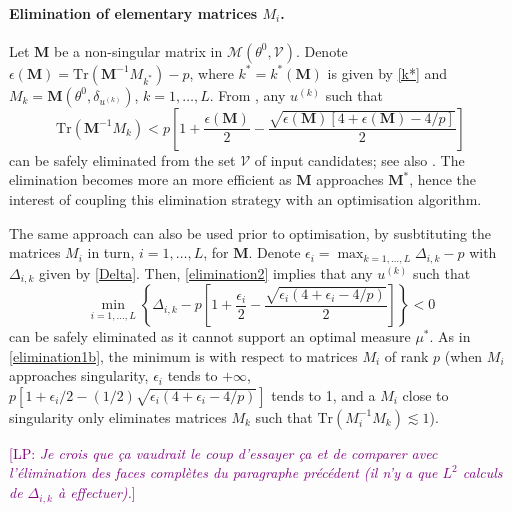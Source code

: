 \documentclass[twocolumn]{autart}
\newcommand{\LP}[1]{{\textcolor{purple}{[LP: \textit{#1}]}}}
\newcommand{\Luc}{\color{magenta} }
\theoremstyle{definition}
\theoremstyle{remark}
\newcommand{\Tr}{\mathrm{Tr}}
\newcommand{\V}{\mathcal{V}}
\newcommand{\Mb}{\mathbf{M}}
\renewcommand{\S}{\mathcal{S}}
\begin{document}
\paragraph{Elimination of elementary matrices $M_i$.} 
{\Luc 

Let $\Mb$ be a non-singular matrix in $\mathcal{M}(\theta^0,\V)$.
Denote $\epsilon(\Mb)=\Tr( \Mb^{-1}M_{k^*} )-p$, where $k^*=k^*(\Mb)$ is given by \eqref{k*} and $M_k=\Mb(\theta^0,\delta_{u^{(k)}})$, $k=1,\ldots,L$. From \cite[Th.~3]{HarmanT2009}, any $u^{(k)}$ such that
\begin{equation}\label{elimination2}
    \Tr(\Mb^{-1}M_k) < p \left[1+\frac{\epsilon(\Mb)}{2} - \frac{\sqrt{\epsilon(\Mb)[4+\epsilon(\Mb)-4/p]}}{2} \right]
\end{equation}
can be safely eliminated from the set $\V$ of input candidates; see also \cite{HPa06_SPL}. The elimination becomes more an more efficient as $\Mb$ approaches $\Mb^*$, hence the interest of coupling this elimination strategy with an optimisation algorithm. 

The same approach can also be used prior to optimisation, by susbtituting the matrices $M_i$ in turn, $i=1,\ldots,L$, for $\Mb$. Denote $\epsilon_i=\max_{k=1,\ldots,L} \Delta_{i,k}-p$ with $\Delta_{i,k}$ given by \eqref{Delta}. Then, \eqref{elimination2} implies that any $u^{(k)}$ such that 
$$
\min_{i=1,\ldots,L} \left\{ \Delta_{i,k} - p \left[1+\frac{\epsilon_i}{2} - \frac{\sqrt{\epsilon_i(4+\epsilon_i-4/p)}}{2} \right] \right\} <0
$$
can be safely eliminated as it cannot support an optimal measure $\mu^*$. As in \eqref{elimination1b}, the minimum is with respect to matrices $M_i$ of rank $p$ (when $M_i$ approaches singularity, $\epsilon_i$ tends to $+\infty$, $p [1+\epsilon_i/2 - (1/2)\sqrt{\epsilon_i(4+\epsilon_i-4/p)}]$ tends to 1, and a $M_i$ close to singularity only eliminates matrices $M_k$ such that $\Tr(M_i^{-1}M_k) \lesssim 1$). 


\LP{Je crois que ça vaudrait le coup d'essayer ça et de comparer avec l'élimination des faces complètes du paragraphe précédent (il n'y a que $L^2$ calculs de $\Delta_{i,k}$ à effectuer).}
}
\end{document}
